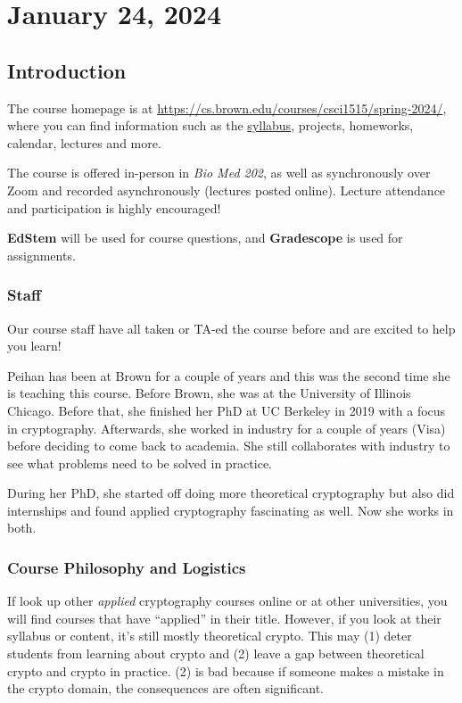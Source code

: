 \section{January 24, 2024}
\label{20240124}

\subsection{Introduction}
The course homepage is at \url{https://cs.brown.edu/courses/csci1515/spring-2024/}, where you can find information such as the \href{https://docs.google.com/document/d/1lvXrMACua9Ma3n2nkLeiRmG-fmjDO1530h22EjkvQ-s/edit?usp=sharing}{syllabus}, projects, homeworks, calendar, lectures and more.

The course is offered in-person in \emph{Bio Med 202}, as well as synchronously over Zoom and recorded asynchronously (lectures posted online). Lecture attendance and participation is highly encouraged!

\textbf{EdStem} will be used for course questions, and \textbf{Gradescope} is used for assignments.

\subsubsection{Staff}

Our course staff have all taken or TA-ed the course before and are excited to help you learn!

Peihan has been at Brown for a couple of years and this was the second time she is teaching this course. Before Brown, she was at the University of Illinois Chicago. Before that, she finished her PhD at UC Berkeley in 2019 with a focus in cryptography. Afterwards, she worked in industry for a couple of years (Visa) before deciding to come back to academia. She still collaborates with industry to see what problems need to be solved in practice.

During her PhD, she started off doing more theoretical cryptography but also did internships and found applied cryptography fascinating as well. Now she works in both.

\subsubsection{Course Philosophy and Logistics}

If look up other \emph{applied} cryptography courses online or at other universities, you will find courses that have ``applied'' in their title. However, if you look at their syllabus or content, it's still mostly theoretical crypto. This may (1) deter students from learning about crypto and (2) leave a gap between theoretical crypto and crypto in practice. (2) is bad because if someone makes a mistake in the crypto domain, the consequences are often significant.

